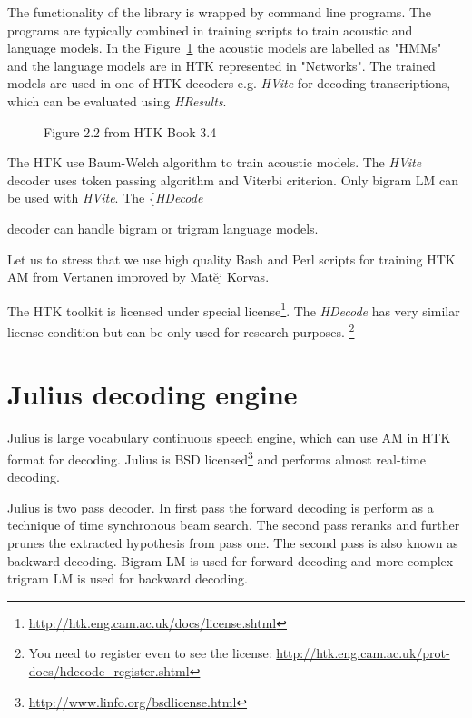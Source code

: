 {The functionality of the library is wrapped by command line programs.
The programs are typically combined in training scripts to train acoustic and language models.
In the Figure~\ref{fig:htk_tools} the acoustic models are labelled as "HMMs" 
and the language models are in \ac{HTK} represented in "Networks".
The trained models are used in one of \ac{HTK} decoders e.g. {\it HVite}\/ for decoding
transcriptions, which can be evaluated using {\it HResults}.

\begin{figure}[!htp]
    \begin{center}
    
    \caption{Figure 2.2 from HTK Book 3.4\cite{young2006htk}}
    \label{fig:htk_tools} 
    \end{center}
\end{figure}

The \ac{HTK} use Baum-Welch algorithm to train acoustic models.
The {\it HVite} decoder uses token passing algorithm and Viterbi criterion.
\cite{HTKBook3.4} %
Only bigram \ac{LM} can be used with {\it HVite}.
The \{\it HDecode} decoder can handle bigram or trigram language models. 


Let us to stress that we use high quality Bash and Perl scripts for training \ac{HTK} \ac{AM}
from Vertanen improved by Matěj Korvas.\cite{vertanen_baseline_2006}\cite{korvas_2014}

The \ac{HTK} toolkit is licensed under special license\footnote{\url{http://htk.eng.cam.ac.uk/docs/license.shtml}}.
The {\it HDecode} has very similar license condition but can be only used for research purposes.
\footnote{You need to register even to see the license: \url{http://htk.eng.cam.ac.uk/prot-docs/hdecode_register.shtml}}

\section{Julius decoding engine}
\label{sec:back_julius}

Julius is large vocabulary continuous speech engine, which can use \ac{AM} in \ac{HTK} format for decoding.\cite{lee2009julius}
Julius is BSD licensed\footnote{\url{http://www.linfo.org/bsdlicense.html}} and performs almost real-time decoding.

Julius is two pass decoder. In first pass the forward decoding is perform as
a technique of time synchronous beam search.
The second pass reranks and further prunes the extracted hypothesis from pass one.
The second pass is also known as backward decoding.
Bigram \ac{LM} is used for forward decoding and more complex trigram \ac{LM} is used for backward decoding.

